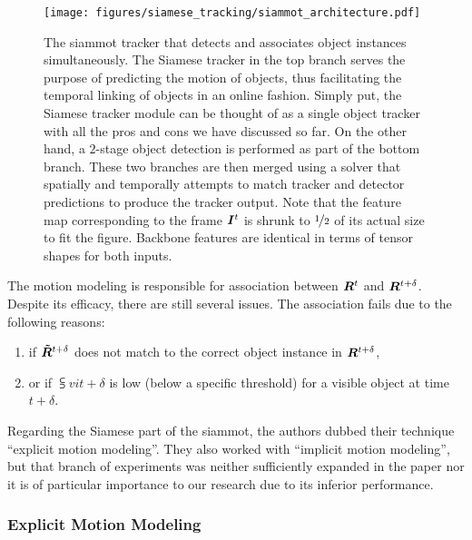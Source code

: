 \begin{figure}[t]
    \centering
    \texttt{[image: figures/siamese\_tracking/siammot\_architecture.pdf]}
    \caption[\gls{siammot} architecture]{The \gls{siammot} tracker that detects and associates object instances simultaneously. The Siamese tracker in the top branch serves the purpose of predicting the motion of objects, thus facilitating the temporal linking of objects in an online fashion. Simply put, the Siamese tracker module can be thought of as a single object tracker with all the pros and cons we have discussed so far. On the other hand, a $2$-stage object detection is performed as part of the bottom branch. These two branches are then merged using a solver that spatially and temporally attempts to match tracker and detector predictions to produce the tracker output. Note that the feature map corresponding to the frame $\bm{I}^{t}$ is shrunk to $\nicefrac{1}{2}$ of its actual size to fit the figure. Backbone features are identical in terms of tensor shapes for both inputs. }
    \label{fig:SiamMOTArchitecture}
\end{figure}

The motion modeling is responsible for association between $\bm{R}^{t}$ and $\bm{R}^{t + \delta}$. Despite its efficacy, there are still several issues. The association fails due to the following reasons:
\begin{enumerate}
    \item if $\bm{\tilde{R}}^{t + \delta}$ does not match to the correct object instance in $\bm{R}^{t + \delta}$,
    \item or if $\subsup{v}{i}{t + \delta}$ is low (below a specific threshold) for a visible object at time $t + \delta$.
\end{enumerate}
Regarding the Siamese part of the \gls{siammot}, the authors dubbed their technique ``explicit motion modeling''. They also worked with ``implicit motion modeling'', but that branch of experiments was neither sufficiently expanded in the paper nor it is of particular importance to our research due to its inferior performance.

\subsubsection{Explicit Motion Modeling}

